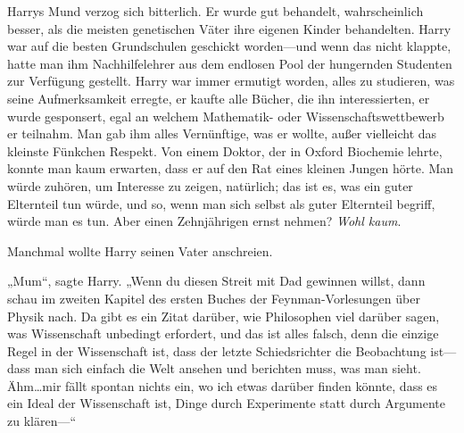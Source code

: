 Harrys Mund verzog sich bitterlich. Er wurde gut behandelt, wahrscheinlich besser, als die meisten genetischen Väter ihre eigenen Kinder behandelten. Harry war auf die besten Grundschulen geschickt worden—und wenn das nicht klappte, hatte man ihm Nachhilfelehrer aus dem endlosen Pool der hungernden Studenten zur Verfügung gestellt. Harry war immer ermutigt worden, alles zu studieren, was seine Aufmerksamkeit erregte, er kaufte alle Bücher, die ihn interessierten, er wurde gesponsert, egal an welchem Mathematik- oder Wissenschaftswettbewerb er teilnahm. Man gab ihm alles Vernünftige, was er wollte, außer vielleicht das kleinste Fünkchen Respekt. Von einem Doktor, der in Oxford Biochemie lehrte, konnte man kaum erwarten, dass er auf den Rat eines kleinen Jungen hörte. Man würde zuhören, um Interesse zu zeigen, natürlich; das ist es, was ein guter Elternteil tun würde, und so, wenn man sich selbst als guter Elternteil begriff, würde man es tun. Aber einen Zehnjährigen ernst nehmen? \emph{Wohl kaum}.

Manchmal wollte Harry seinen Vater anschreien.

„Mum“, sagte Harry. „Wenn du diesen Streit mit Dad gewinnen willst, dann schau im zweiten Kapitel des ersten Buches der Feynman-Vorlesungen über Physik nach. Da gibt es ein Zitat darüber, wie Philosophen viel darüber sagen, was Wissenschaft unbedingt erfordert, und das ist alles falsch, denn die einzige Regel in der Wissenschaft ist, dass der letzte Schiedsrichter die Beobachtung ist—dass man sich einfach die Welt ansehen und berichten muss, was man sieht. Ähm…mir fällt spontan nichts ein, wo ich etwas darüber finden könnte, dass es ein Ideal der Wissenschaft ist, Dinge durch Experimente statt durch Argumente zu klären—“

